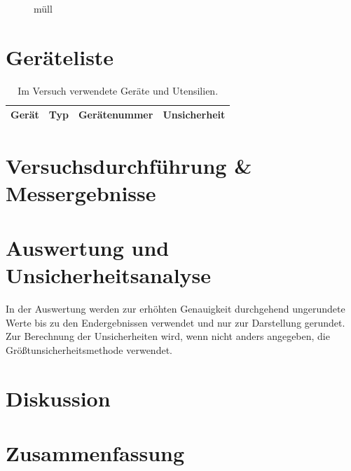\documentclass[12pt,a4paper,twoside]{article}
\begin{document}
    \begin{figure}[H]
        \centering
        \caption{müll}
        \label{fig:müllbild}
    \end{figure}

\section{Geräteliste} %

    \begin{table}[H]
        \centering
        \caption{Im Versuch verwendete Geräte und Utensilien.}
        \label{tab:geraete}
        \begin{tabular}{| l | l | l | l |}
            \hline
            Gerät   & Typ   & Gerätenummer  & Unsicherheit \\
            \hline
        \end{tabular}
    \end{table}


\section{Versuchsdurchführung \& Messergebnisse} %


\section{Auswertung und Unsicherheitsanalyse} %

In der Auswertung werden zur erhöhten Genauigkeit durchgehend ungerundete Werte bis zu den Endergebnissen verwendet und nur zur Darstellung gerundet. \\
Zur Berechnung der Unsicherheiten wird, wenn nicht anders angegeben, die Größtunsicherheitsmethode verwendet.


\section{Diskussion} %


\section{Zusammenfassung} %


\printbibliography[heading=bibintoc]
\end{document}
